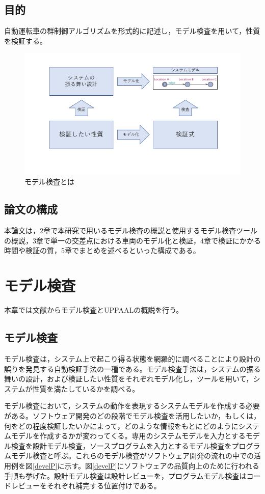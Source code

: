 \documentclass{tpu-sotu}
\begin{document}
	\section{目的}
	自動運転車の群制御アルゴリズムを形式的に記述し，モデル検査を用いて，性質を検証する。
	\begin{figure}[htbp]
	\centering
	\includegraphics[width=150mm]{ModelVerification.png}
	\caption{モデル検査とは}
	\label{ModelV}
	\end{figure}
	\section{論文の構成}
	本論文は，2章で本研究で用いるモデル検査の概説と使用するモデル検査ツールの概説，3章で単一の交差点における車両のモデル化と検証，4章で検証にかかる時間や検証の質，5章でまとめを述べるといった構成である。
\chapter{モデル検査}
本章では文献\cite{a1}からモデル検査とUPPAALの概説を行う。
	\section{モデル検査}
	モデル検査は，システム上で起こり得る状態を網羅的に調べることにより設計の誤りを発見する自動検証手法の一種である。モデル検査手法は，システムの振る舞いの設計，および検証したい性質をそれぞれモデル化し，ツールを用いて，システムが性質を満たしているかを調べる。
	
	モデル検査において，システムの動作を表現するシステムモデルを作成する必要がある。ソフトウェア開発のどの段階でモデル検査を活用したいか，もしくは，何をどの程度検証したいかによって，どのような情報をもとにどのようにシステムモデルを作成するかが変わってくる。専用のシステムモデルを入力とするモデル検査を設計モデル検査，ソースプログラムを入力とするモデル検査をプログラムモデル検査と呼ぶ。これらのモデル検査がソフトウェア開発の流れの中での活用例を図\ref{develP}に示す。図\ref{develP}にソフトウェアの品質向上のために行われる手順も挙げた。設計モデル検査は設計レビューを，プログラムモデル検査はコードレビューをそれぞれ補完する位置付けである。
\end{document}
